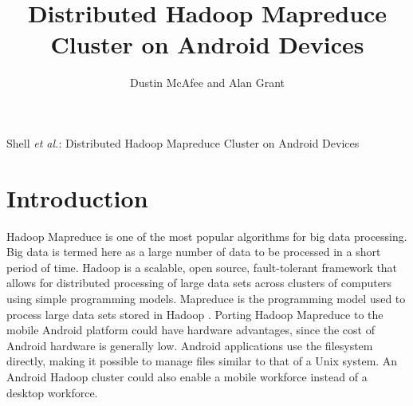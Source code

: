 \documentclass[10pt,journal,compsoc,float]{IEEEtran}
\begin{document}
\title{Distributed Hadoop Mapreduce Cluster on Android Devices}
\author{Dustin McAfee and Alan Grant}

{Shell \MakeLowercase{\textit{et al.}}: Distributed Hadoop Mapreduce Cluster on Android Devices}


\maketitle

\IEEEdisplaynontitleabstractindextext
\IEEEpeerreviewmaketitle

\ifCLASSOPTIONcompsoc
{}
\else
\section{Introduction}
\label{sec:introduction}
\fi
Hadoop Mapreduce is one of the most popular algorithms for big data processing. Big data is termed here as a large number of data to be processed in a short period of time. Hadoop is a scalable, open source, fault-tolerant framework that allows for distributed processing of large data sets across clusters of computers using simple programming models. Mapreduce is the programming model used to process large data sets stored in Hadoop \cite{Mapreduce}. Porting Hadoop Mapreduce to the mobile Android platform could have hardware advantages, since the cost of Android hardware is generally low. Android applications use the filesystem directly, making it possible to manage files similar to that of a Unix system. An Android Hadoop cluster could also enable a mobile workforce instead of a desktop workforce.
\end{document}
